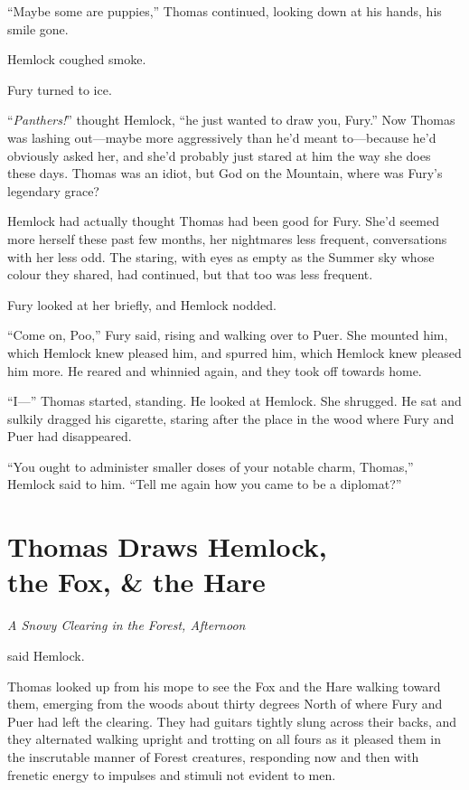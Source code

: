 \documentclass[11pt,a5paper]{article}
\newcommand{\alet}[1]{\textit{#1}\vspace{1em}}
\begin{document}
``Maybe some are puppies,'' Thomas continued, looking down at his hands, his smile gone.

Hemlock coughed smoke.

Fury turned to ice.

``\emph{Panthers!}'' thought Hemlock, ``he just wanted to draw you, Fury.'' Now Thomas was lashing out---maybe more aggressively than he'd meant to---because he'd obviously asked her, and she'd probably just stared at him the way she does these days. Thomas was an idiot, but God on the Mountain, where was Fury's legendary grace?

Hemlock had actually thought Thomas had been good for Fury. She'd seemed more herself these past few months, her nightmares less frequent, conversations with her less odd. The staring, with eyes as empty as the Summer sky whose colour they shared, had continued, but that too was less frequent.

Fury looked at her briefly, and Hemlock nodded.

``Come on, Poo,'' Fury said, rising and walking over to Puer. She mounted him, which Hemlock knew pleased him, and spurred him, which Hemlock knew pleased him more. He reared and whinnied again, and they took off towards home.

``I---'' Thomas started, standing. He looked at Hemlock. She shrugged. He sat and sulkily dragged his cigarette, staring after the place in the wood where Fury and Puer had disappeared.

``You ought to administer smaller doses of your notable charm, Thomas,'' Hemlock said to him. ``Tell me again how you came to be a diplomat?''

\newpage

\section{Thomas Draws Hemlock,\\ the Fox, \& the Hare}

\alet{A Snowy Clearing in the Forest, Afternoon}

 said Hemlock.

Thomas looked up from his mope to see the Fox and the Hare walking toward them, emerging from the woods about thirty degrees North of where Fury and Puer had left the clearing. They had guitars tightly slung across their backs, and they alternated walking upright and trotting on all fours as it pleased them in the inscrutable manner of Forest creatures, responding now and then with frenetic energy to impulses and stimuli not evident to men.
\end{document}

